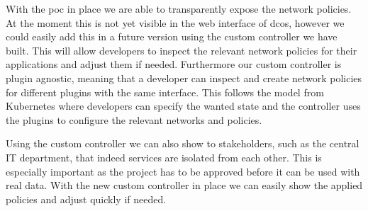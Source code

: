 With the \gls{poc} in place we are able to transparently expose the network policies. At the moment this is not yet visible in the web interface of \gls{dcos}, however we could easily add this in a future version using the custom controller we have built. This will allow developers to inspect the relevant network policies for their applications and adjust them if needed. Furthermore our custom controller is plugin agnostic, meaning that a developer can inspect and create network policies for different plugins with the same interface. This follows the model from Kubernetes where developers can specify the wanted state and the controller uses the plugins to configure the relevant networks and policies. 

Using the custom controller we can also show to stakeholders, such as the central IT department, that indeed services are isolated from each other. This is especially important as the project has to be approved before it can be used with real data. With the new custom controller in place we can easily show the applied policies and adjust quickly if needed.
